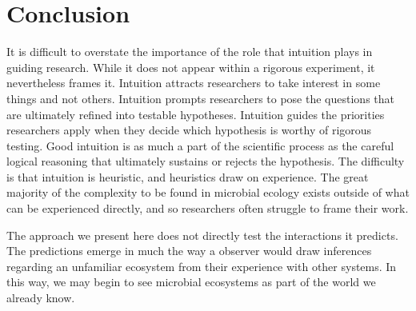 \section{Conclusion}

It is difficult to overstate the importance of the role that intuition plays in guiding research. While it does not appear within a rigorous experiment, it nevertheless frames it. Intuition attracts researchers to take interest in some things and not others. Intuition prompts researchers to pose the questions that are ultimately refined into testable hypotheses. Intuition guides the priorities researchers apply when they decide which hypothesis is worthy of rigorous testing. Good intuition is as much a part of the scientific process as the careful logical reasoning that ultimately sustains or rejects the hypothesis. The difficulty is that intuition is heuristic, and heuristics draw on experience. The great majority of the complexity to be found in microbial ecology exists outside of what can be experienced directly, and so researchers often struggle to frame their work.

The approach we present here does not directly test the interactions it predicts. The predictions emerge in much the way a observer would draw inferences regarding an unfamiliar ecosystem from their experience with other systems. In this way, we may begin to see microbial ecosystems as part of the world we already know.